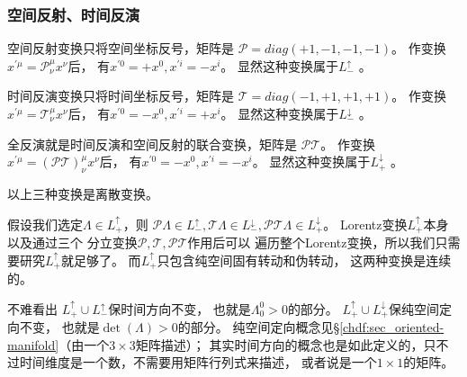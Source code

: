 \subsubsection{空间反射、时间反演} %
空间反射变换只将空间坐标反号，矩阵是
$\mathcal{P} = diag (+1,-1,-1,-1)$。
作变换$x^{\prime \mu}=\mathcal{P}^\mu _\nu x^{\nu}$后，
有$x^{\prime 0}=+x^0, x^{\prime i}= -x^i$。
显然这种变换属于$L^{\uparrow}_{-}$ 。

时间反演变换只将时间坐标反号，矩阵是
$\mathcal{T} = diag (-1,+1,+1,+1)$。
作变换$x^{\prime \mu}=\mathcal{T}^\mu _\nu x^{\nu}$后，
有$x^{\prime 0}=-x^0, x^{\prime i}= +x^i$。
显然这种变换属于$L^{\downarrow}_{-}$ 。

全反演就是时间反演和空间反射的联合变换，矩阵是
$\mathcal{PT}$。
作变换$x^{\prime \mu}=(\mathcal{PT})^\mu _\nu x^{\nu}$后，
有$x^{\prime 0}=-x^0, x^{\prime i}= -x^i$。
显然这种变换属于$L^{\downarrow}_{+}$ 。



以上三种变换是离散变换。

假设我们选定$\Lambda  \in  L^{\uparrow}_{+}$，则
$\mathcal{P}\Lambda  \in  L^{\uparrow}_{-},
\mathcal{T}\Lambda  \in  L^{\downarrow}_{-},
\mathcal{PT}\Lambda \in  L^{\downarrow}_{+}$。
Lorentz变换$L^{\uparrow}_{+}$本身以及通过三个
分立变换$\mathcal{P},\mathcal{T},\mathcal{PT}$作用后可以
遍历整个Lorentz变换，所以我们只需要研究$L^{\uparrow}_{+}$就足够了。
而$L^{\uparrow}_{+}$只包含纯空间固有转动和伪转动，
这两种变换是连续的。

不难看出 $L^{\uparrow}_{+}\cup L^{\uparrow}_{-}$保时间方向不变，
也就是$\Lambda^0_0 >0$的部分。
$L^{\uparrow}_{+}\cup L^{\downarrow}_{+}$保纯空间定向不变，
也就是$\det (\Lambda) >0$的部分。
纯空间定向概念见\S\ref{chdf:sec_oriented-manifold}（由一个$3\times 3$矩阵描述）；
其实时间方向的概念也是如此定义的，只不过时间维度是一个数，不需要用矩阵行列式来描述，
或者说是一个$1\times 1$的矩阵。

